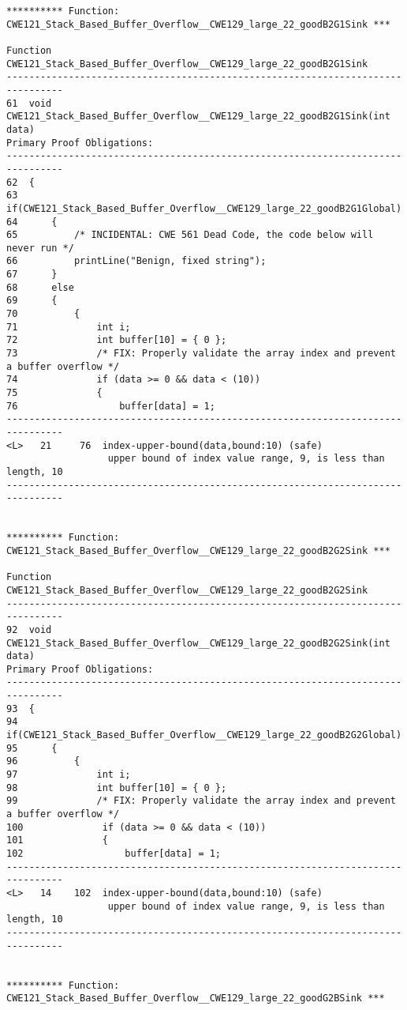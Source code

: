\documentclass[11pt]{article}
\begin{document}
\begin{scriptsize}
\begin{verbatim}
********** Function: CWE121_Stack_Based_Buffer_Overflow__CWE129_large_22_goodB2G1Sink ***

Function CWE121_Stack_Based_Buffer_Overflow__CWE129_large_22_goodB2G1Sink
--------------------------------------------------------------------------------
61  void CWE121_Stack_Based_Buffer_Overflow__CWE129_large_22_goodB2G1Sink(int data)
Primary Proof Obligations:
--------------------------------------------------------------------------------
62  {
63      if(CWE121_Stack_Based_Buffer_Overflow__CWE129_large_22_goodB2G1Global)
64      {
65          /* INCIDENTAL: CWE 561 Dead Code, the code below will never run */
66          printLine("Benign, fixed string");
67      }
68      else
69      {
70          {
71              int i;
72              int buffer[10] = { 0 };
73              /* FIX: Properly validate the array index and prevent a buffer overflow */
74              if (data >= 0 && data < (10))
75              {
76                  buffer[data] = 1;
--------------------------------------------------------------------------------
<L>   21     76  index-upper-bound(data,bound:10) (safe)
                  upper bound of index value range, 9, is less than length, 10
--------------------------------------------------------------------------------


********** Function: CWE121_Stack_Based_Buffer_Overflow__CWE129_large_22_goodB2G2Sink ***

Function CWE121_Stack_Based_Buffer_Overflow__CWE129_large_22_goodB2G2Sink
--------------------------------------------------------------------------------
92  void CWE121_Stack_Based_Buffer_Overflow__CWE129_large_22_goodB2G2Sink(int data)
Primary Proof Obligations:
--------------------------------------------------------------------------------
93  {
94      if(CWE121_Stack_Based_Buffer_Overflow__CWE129_large_22_goodB2G2Global)
95      {
96          {
97              int i;
98              int buffer[10] = { 0 };
99              /* FIX: Properly validate the array index and prevent a buffer overflow */
100              if (data >= 0 && data < (10))
101              {
102                  buffer[data] = 1;
--------------------------------------------------------------------------------
<L>   14    102  index-upper-bound(data,bound:10) (safe)
                  upper bound of index value range, 9, is less than length, 10
--------------------------------------------------------------------------------


********** Function: CWE121_Stack_Based_Buffer_Overflow__CWE129_large_22_goodG2BSink ***


\end{verbatim}
\end{scriptsize}
\end{document}
